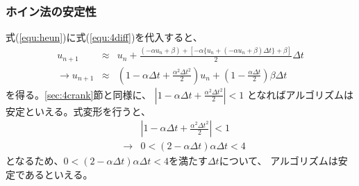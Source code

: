\documentclass[a4j, titlepage]{jsarticle}
\numberwithin{equation}{section}
\begin{document}
        \subsubsection{ホイン法の安定性}
            式(\ref{equ:heun})に式(\ref{equ:4diff})を代入すると、
            \begin{eqnarray*}
                u_{n + 1} &\approx& u_n + \frac{(-\alpha u_n + \beta) + [-\alpha \{u_n + (-\alpha u_n + \beta)\Delta t\} + \beta]}{2}\Delta t \\
                \rightarrow u_{n + 1} &\approx& \left(1 - \alpha\Delta t + \frac{\alpha^2\Delta t^2}{2}\right)u_n + \left(1 - \frac{\alpha\Delta t}{2}\right)\beta\Delta t
            \end{eqnarray*}
            を得る。\ref{sec:4crank}節と同様に、
            $\displaystyle\left|1 - \alpha\Delta t + \frac{\alpha^2\Delta t^2}{2}\right| < 1$
            となればアルゴリズムは安定といえる。式変形を行うと、
            \begin{eqnarray}
                &&\left|1 - \alpha\Delta t + \frac{\alpha^2\Delta t^2}{2}\right| < 1 \nonumber \\
                &\rightarrow& 0 < (2 - \alpha\Delta t)\alpha\Delta t < 4 \label{equ:4heun}
            \end{eqnarray}
            となるため、$0 < (2 - \alpha\Delta t)\alpha\Delta t < 4$を満たす$\Delta t$について、
            アルゴリズムは安定であるといえる。
\end{document}
